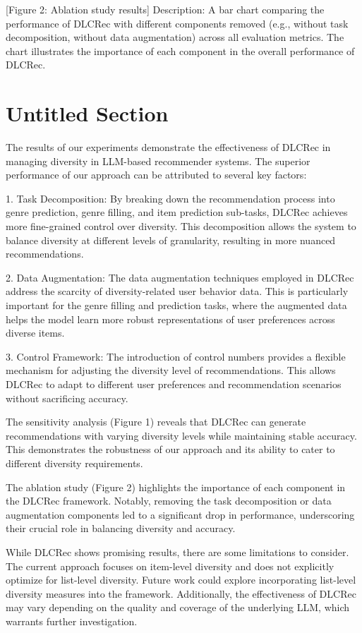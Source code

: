 \documentclass[10pt,twocolumn,letterpaper]{article}
\begin{document}
[Figure 2: Ablation study results]
Description: A bar chart comparing the performance of DLCRec with different components removed (e.g., without task decomposition, without data augmentation) across all evaluation metrics. The chart illustrates the importance of each component in the overall performance of DLCRec.

\section{Untitled Section}

The results of our experiments demonstrate the effectiveness of DLCRec in managing diversity in LLM-based recommender systems. The superior performance of our approach can be attributed to several key factors:

1. Task Decomposition: By breaking down the recommendation process into genre prediction, genre filling, and item prediction sub-tasks, DLCRec achieves more fine-grained control over diversity. This decomposition allows the system to balance diversity at different levels of granularity, resulting in more nuanced recommendations.

2. Data Augmentation: The data augmentation techniques employed in DLCRec address the scarcity of diversity-related user behavior data. This is particularly important for the genre filling and prediction tasks, where the augmented data helps the model learn more robust representations of user preferences across diverse items.

3. Control Framework: The introduction of control numbers provides a flexible mechanism for adjusting the diversity level of recommendations. This allows DLCRec to adapt to different user preferences and recommendation scenarios without sacrificing accuracy.

The sensitivity analysis (Figure 1) reveals that DLCRec can generate recommendations with varying diversity levels while maintaining stable accuracy. This demonstrates the robustness of our approach and its ability to cater to different diversity requirements.

The ablation study (Figure 2) highlights the importance of each component in the DLCRec framework. Notably, removing the task decomposition or data augmentation components led to a significant drop in performance, underscoring their crucial role in balancing diversity and accuracy.

While DLCRec shows promising results, there are some limitations to consider. The current approach focuses on item-level diversity and does not explicitly optimize for list-level diversity. Future work could explore incorporating list-level diversity measures into the framework. Additionally, the effectiveness of DLCRec may vary depending on the quality and coverage of the underlying LLM, which warrants further investigation.
\end{document}
